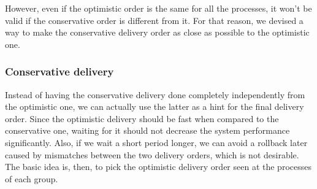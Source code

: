 \documentclass[times, 10pt]{article}
\begin{document}
However, even if the optimistic order is the same for all the processes, it won't be valid if the conservative order is different from it. For that reason, we devised a way to make the conservative delivery order as close as possible to the optimistic one.

\subsubsection{Conservative delivery}

Instead of having the conservative delivery done completely independently from the optimistic one, we can actually use the latter as a hint for the final delivery order. Since the optimistic delivery should be fast when compared to the conservative one, waiting for it should not decrease the system performance significantly. Also, if we wait a short period longer, we can avoid a rollback later caused by mismatches between the two delivery orders, which is not desirable. The basic idea is, then, to pick the optimistic delivery order seen at the processes of each group.

\end{document}
